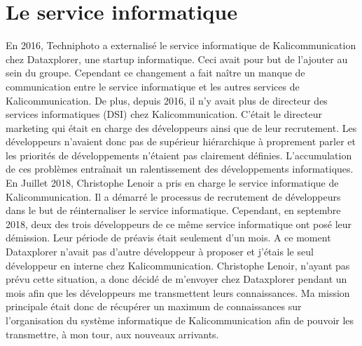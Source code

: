 \section{Le service informatique}
En 2016, Techniphoto a externalisé le service informatique de Kalicommunication chez Dataxplorer, une startup informatique. Ceci avait pour but de l'ajouter au sein du groupe. Cependant ce changement a fait naître un manque de communication entre le service informatique et les autres services de Kalicommunication.\newline
De plus, depuis 2016, il n'y avait plus de directeur des services informatiques (DSI) chez Kalicommunication. C'était le directeur marketing qui était en charge des développeurs ainsi que de leur recrutement. Les développeurs n'avaient donc pas de supérieur hiérarchique à proprement parler et les priorités de développements n'étaient pas clairement définies. L'accumulation de ces problèmes entraînait un ralentissement des développements informatiques.\newline
En Juillet 2018, Christophe Lenoir a pris en charge le service informatique de Kalicommunication. Il a démarré le processus de recrutement de développeurs dans le but de réinternaliser le service informatique.\newline
Cependant, en septembre 2018, deux des trois développeurs de ce même service informatique ont posé leur démission. Leur période de préavis était seulement d'un mois. A ce moment Dataxplorer n'avait pas d'autre développeur à proposer et j'étais le seul développeur en interne chez Kalicommunication. Christophe Lenoir, n'ayant pas prévu cette situation, a donc décidé de m'envoyer chez Dataxplorer pendant un mois afin que les développeurs me transmettent leurs connaissances.\newline
Ma mission principale était donc de récupérer un maximum de connaissances sur l'organisation du système informatique de Kalicommunication afin de pouvoir les transmettre, à mon tour, aux nouveaux arrivants.